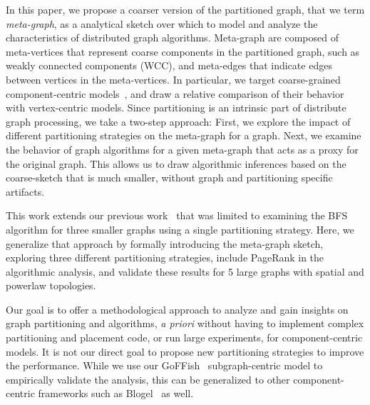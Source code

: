 \documentclass[10pt,conference, compsocconf]{IEEEtran}
\begin{document}
In this paper, we propose a coarser version of the partitioned graph, that we term \emph{meta-graph}, as a analytical sketch over which to model and analyze the characteristics of distributed graph algorithms. Meta-graph are composed of meta-vertices that represent coarse components in the partitioned graph, such as weakly connected components (WCC), and meta-edges that indicate edges between vertices in the meta-vertices. In particular, we target coarse-grained component-centric models~\cite{blogel,goffish}, and draw a relative comparison of their behavior with vertex-centric models. Since partitioning is an intrinsic part of distribute graph processing, we take a two-step approach: First, we explore the impact of different partitioning strategies on the meta-graph for a graph. Next, we examine the behavior of graph algorithms for a given meta-graph that acts as a proxy for the original graph. This allows us to draw algorithmic inferences based on the coarse-sketch that is much smaller, without graph and partitioning specific artifacts. 

This work extends our previous work~\cite{dindokar:parlearning:2015} that was limited to examining the BFS algorithm for three smaller graphs using a single partitioning strategy. Here, we generalize that approach by formally introducing the meta-graph sketch, exploring three different partitioning strategies, include PageRank in the algorithmic analysis, and validate these results for 5 large graphs with spatial and powerlaw topologies. 

Our goal is to offer a methodological approach to analyze and gain insights on graph partitioning and algorithms, \emph{a priori} without having to implement complex partitioning and placement code, or run large experiments, for component-centric models. It is not our direct goal to propose new partitioning strategies to improve the performance. While we use our GoFFish~\cite{goffish} subgraph-centric model to empirically validate the analysis, this can be generalized to other component-centric frameworks such as Blogel~\cite{blogel} as well.
\end{document}
